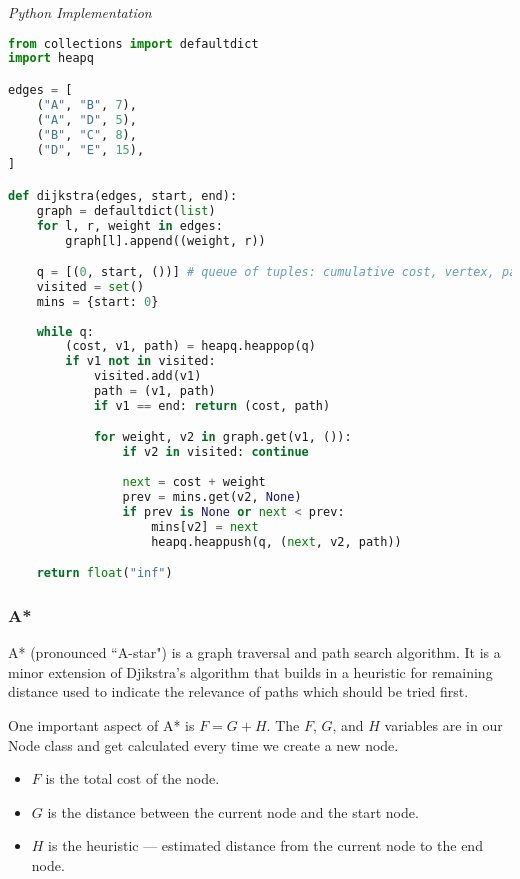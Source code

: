 \documentclass{article}
\begin{document}
\vspace{8pt} \emph{Python Implementation}
\begin{lstlisting}[language=Python]
from collections import defaultdict
import heapq 

edges = [
    ("A", "B", 7),
    ("A", "D", 5),
    ("B", "C", 8),
    ("D", "E", 15),
]

def dijkstra(edges, start, end):
    graph = defaultdict(list)
    for l, r, weight in edges:
        graph[l].append((weight, r))

    q = [(0, start, ())] # queue of tuples: cumulative cost, vertex, path
    visited = set()
    mins = {start: 0}
    
    while q:
        (cost, v1, path) = heapq.heappop(q)
        if v1 not in visited:
            visited.add(v1)
            path = (v1, path)
            if v1 == end: return (cost, path)

            for weight, v2 in graph.get(v1, ()):
                if v2 in visited: continue
                
                next = cost + weight
                prev = mins.get(v2, None)
                if prev is None or next < prev:
                    mins[v2] = next
                    heapq.heappush(q, (next, v2, path))

    return float("inf")
\end{lstlisting}

    \subsubsection{A*}
    A* (pronounced ``A-star") is a graph traversal and path search algorithm. It is a minor extension of Djikstra's algorithm that builds in a heuristic for remaining distance used to indicate the relevance of paths which should be tried first.
    
    One important aspect of A* is $F = G + H$. The $F$, $G$, and $H$ variables are in our Node class and get calculated every time we create a new node. 
    \begin{itemize}
        \item $F$ is the total cost of the node.
        \item $G$ is the distance between the current node and the start node.
        \item $H$ is the heuristic — estimated distance from the current node to the end node.
    \end{itemize}
    
\end{document}
